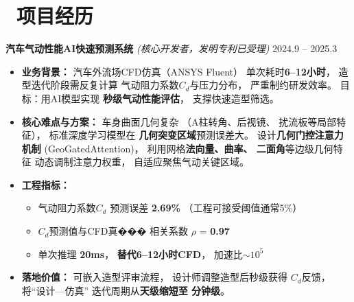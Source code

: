 \documentclass[11pt]{article}
\begin{document}
\section{\makebox[\widthof{\faBriefcase}][c]{\color{CVBlue}%
\faBriefcase}\ 项目经历}

\textbf{汽车气动性能AI快速预测系统} 
\textit{(核心开发者，发明专利已受理)} 
\hfill 2024.9 -- 2025.3
\begin{itemize}
    \item \textbf{业务背景：}
    汽车外流场CFD仿真（ANSYS Fluent）
    单次耗时\textbf{6--12小时}，
    造型迭代阶段需反复计算
    气动阻力系数$C_d$与压力分布，
    严重制约研发效率。
    目标：用AI模型实现
    \textbf{秒级气动性能评估}，
    支撑快速造型筛选。
    
    \item \textbf{核心难点与方案：}
    车身曲面几何复杂
    （A柱转角、后视镜、
    扰流板等局部特征），
    标准深度学习模型在
    \textbf{几何突变区域}预测误差大。
    设计\textbf{几何门控注意力机制}
    (GeoGatedAttention)，
    利用网格\textbf{法向量、曲率、
    二面角}等边级几何特征
    动态调制注意力权重，
    自适应聚焦气动关键区域。
    
    \item \textbf{工程指标：}
    \begin{itemize}
        \item 气动阻力系数$C_d$
        预测误差 \textbf{2.69\%}
        （工程可接受阈值通常5\%）
        \item $C_d$预测值与CFD真���
        相关系数 $\rho$ = \textbf{0.97}
        \item 单次推理 \textbf{20ms}，
        \textbf{替代6--12小时CFD}，
        加速比$\sim$$10^5$
    \end{itemize}
    
    \item \textbf{落地价值：}
    可嵌入造型评审流程，
    设计师调整造型后秒级获得
    $C_d$反馈，将``设计—仿真''
    迭代周期从\textbf{天级缩短至
    分钟级}。
\end{itemize}
\end{document}
